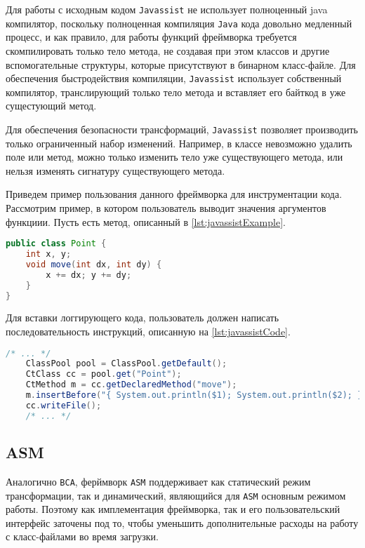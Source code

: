 Для работы с исходным кодом \texttt{Javassist} не использует полноценный java компилятор, поскольку полноценная компиляция \texttt{Java} кода довольно медленный процесс, и как правило, для работы функций фреймворка требуется скомпилировать только тело метода, не создавая при этом классов и другие вспомогательные структуры, которые присутствуют в бинарном класс-файле. Для обеспечения быстродействия компиляции, \texttt{Javassist} использует собственный компилятор, транслирующий только тело метода и вставляет его байткод в уже сущестующий метод.

Для обеспечения безопасности трансформаций, \texttt{Javassist} позволяет производить только ограниченный набор изменений. Например, в классе невозможно удалить поле или метод, можно только изменить тело уже существующего метода, или нельзя изменять сигнатуру существующего метода.

Приведем пример пользования данного фреймворка для инструментации кода. Рассмотрим пример, в котором пользователь выводит значения аргументов функциии. Пусть есть метод, описанный в \autoref{lst:javassistExample}.

\begin{lstlisting}[language=Java, caption=Исходный класс, label=lst:javassistExample]
public class Point {
    int x, y;
    void move(int dx, int dy) {
        x += dx; y += dy;
    }
}
\end{lstlisting}

Для вставки логгирующего кода, пользователь должен написать последовательность инструкций, описанную на \autoref{lst:javassistCode}.

\begin{lstlisting}[language=Java, caption={Код, добавляющий логгирование}, label=lst:javassistCode]
    /* ... */
    ClassPool pool = ClassPool.getDefault();
    CtClass cc = pool.get("Point");
    CtMethod m = cc.getDeclaredMethod("move");
    m.insertBefore("{ System.out.println($1); System.out.println($2); }");
    cc.writeFile();
    /* ... */
\end{lstlisting}

\subsection{ASM}

Аналогично \texttt{BCA}, ферймворк \texttt{ASM} \cite{asm} поддерживает как статический режим трансформации, так и динамический, являющийся для \texttt{ASM} основным режимом работы. Поэтому как имплементация фреймворка, так и его пользовательский интерфейс заточены под то, чтобы уменьшить дополнительные расходы на работу с класс-файлами во время загрузки.


